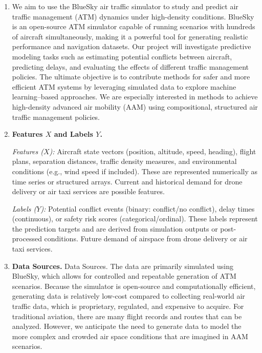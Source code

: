 \documentclass[a4paper]{article}
\begin{document}
\begin{enumerate}
    \item We aim to use the BlueSky air traffic simulator to study and predict air traffic management (ATM) dynamics under high-density conditions. BlueSky is an open-source ATM simulator capable of running scenarios with hundreds of aircraft simultaneously, making it a powerful tool for generating realistic performance and navigation datasets. Our project will investigate predictive modeling tasks such as estimating potential conflicts between aircraft, predicting delays, and evaluating the effects of different traffic management policies. The ultimate objective is to contribute methods for safer and more efficient ATM systems by leveraging simulated data to explore machine learning–based approaches. We are especially interested in methods to achieve high-density advanced air mobility (AAM) using compositional, structured air traffic management policies.

\item \textbf{Features $X$ and Labels $Y$.}

\emph{Features ($X$):} Aircraft state vectors (position, altitude, speed, heading), flight plans, separation distances, traffic density measures, and environmental conditions (e.g., wind speed if included). These are represented numerically as time series or structured arrays. Current and historical demand for drone delivery or air taxi services are possible features.

\emph{Labels ($Y$):} Potential conflict events (binary: conflict/no conflict), delay times (continuous), or safety risk scores (categorical/ordinal). These labels represent the prediction targets and are derived from simulation outputs or post-processed conditions. Future demand of airspace from drone delivery or air taxi services.


\item \textbf{Data Sources.} Data Sources. The data are primarily simulated using BlueSky, which allows for controlled and repeatable generation of ATM scenarios. Because the simulator is open-source and computationally efficient, generating data is relatively low-cost compared to collecting real-world air traffic data, which is proprietary, regulated, and expensive to acquire. For traditional aviation, there are many flight records and routes that can be analyzed. However, we anticipate the need to generate data to model the more complex and crowded air space conditions that are imagined in AAM scenarios.



\end{enumerate}
\end{document}
